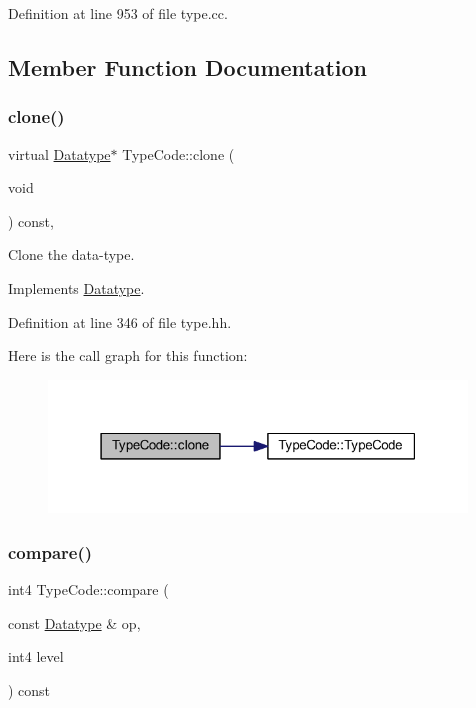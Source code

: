 Definition at line 953 of file type.\+cc.



\subsection{Member Function Documentation}
\mbox{\label{class_type_code_a450e2f5f2cd4a4573573da9a20e4d2fa}} 
\subsubsection{\texorpdfstring{clone()}{clone()}}
{\footnotesize\ttfamily virtual \mbox{\hyperlink{class_datatype}{Datatype}}$\ast$ Type\+Code\+::clone (\begin{DoxyParamCaption}\item[{void}]{ }\end{DoxyParamCaption}) const\hspace{0.3cm}{\ttfamily [inline]}, {\ttfamily [virtual]}}



Clone the data-\/type. 



Implements \mbox{\hyperlink{class_datatype_a6bd032d91f40efe36841adc85b3ff0ec}{Datatype}}.



Definition at line 346 of file type.\+hh.

Here is the call graph for this function\+:
\nopagebreak
\begin{figure}[H]
\begin{center}
\leavevmode
\includegraphics[width=315pt]{class_type_code_a450e2f5f2cd4a4573573da9a20e4d2fa_cgraph}
\end{center}
\end{figure}
\mbox{\label{class_type_code_a96f56d57d3c88430321564e01dc1ad90}} 
\subsubsection{\texorpdfstring{compare()}{compare()}}
{\footnotesize\ttfamily int4 Type\+Code\+::compare (\begin{DoxyParamCaption}\item[{const \mbox{\hyperlink{class_datatype}{Datatype}} \&}]{op,  }\item[{int4}]{level }\end{DoxyParamCaption}) const\hspace{0.3cm}{\ttfamily [virtual]}}



